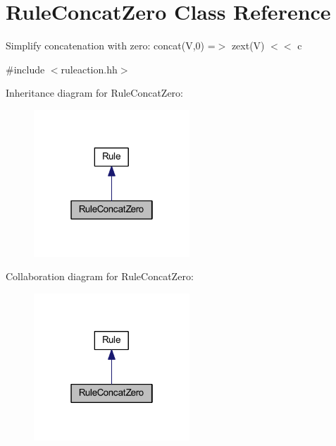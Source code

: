 \hypertarget{class_rule_concat_zero}{}\section{Rule\+Concat\+Zero Class Reference}
\label{class_rule_concat_zero}


Simplify concatenation with zero\+: {\ttfamily concat(\+V,0) =$>$ zext(\+V) $<$$<$ c}  




{\ttfamily \#include $<$ruleaction.\+hh$>$}



Inheritance diagram for Rule\+Concat\+Zero\+:
\nopagebreak
\begin{figure}[H]
\begin{center}
\leavevmode
\includegraphics[width=166pt]{class_rule_concat_zero__inherit__graph}
\end{center}
\end{figure}


Collaboration diagram for Rule\+Concat\+Zero\+:
\nopagebreak
\begin{figure}[H]
\begin{center}
\leavevmode
\includegraphics[width=166pt]{class_rule_concat_zero__coll__graph}
\end{center}
\end{figure}
